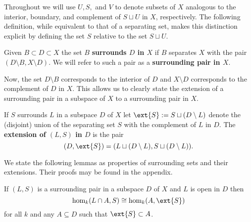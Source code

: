 Throughout we will use $U, S,$ and $V$ to denote subsets of $X$ analogous to the interior, boundary, and complement of $S\sqcup U$ in $X$, respectively.
The following definition, while equivalent to that of a separating set, makes this distinction explicit by defining the set $S$ relative to the set $S\sqcup U$.

\begin{definition}[Surrounding]
  Given $B\subset D \subset X$ the set $B$ \textbf{surrounds $D$ in $X$} if $B$ separates $X$ with the pair $(D\setminus B, X\setminus D)$.
  We will refer to such a pair as a \textbf{surrounding pair in $X$}.
\end{definition}

Now, the set $D\setminus B$ corresponds to the interior of $D$ and $X\setminus D$ corresponds to the complement of $D$ in $X$.
This allows us to clearly state the extension of a surrounding pair in a subspace of $X$ to a surrounding pair in $X$.

\begin{definition}[Extension]
  If $S$ surrounds $L$ in a subspace $D$ of $X$ let $\ext{S} := S\sqcup (D\setminus L)$ denote the (disjoint) union of the separating set $S$ with the complement of $L$ in $D$.
  The \textbf{extension of $(L, S)$ in $D$} is the pair
  \[ (D, \ext{S}) = (L\sqcup (D\setminus L), S\sqcup (D\setminus L)).\]
\end{definition}

We state the following lemmas as properties of surrounding sets and their extensions.
Their proofs may be found in the appendix.

\begin{lemma}\label{lem:excision}
  If $(L, S)$ is a surrounding pair in a subspace $D$ of $X$ and $L$ is open in $D$ then
  \[ \hom_k(L\cap A, S) \cong \hom_k(A, \ext{S}) \]
  for all $k$ and any $A\subseteq D$ such that $\ext{S}\subset A$.
\end{lemma}

